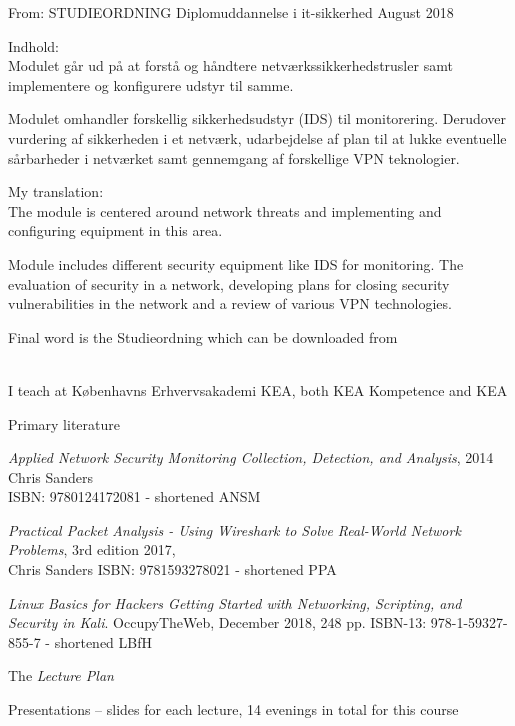 \documentclass[Screen16to9,17pt]{foils}
\begin{document}

From: STUDIEORDNING Diplomuddannelse i it-sikkerhed August 2018

Indhold:\\
Modulet går ud på at forstå og håndtere netværkssikkerhedstrusler samt implementere og
konfigurere udstyr til samme.

Modulet omhandler forskellig sikkerhedsudstyr (IDS) til monitorering. Derudover vurdering af sikkerheden i et netværk, udarbejdelse af plan til at lukke eventuelle sårbarheder i netværket samt gennemgang af forskellige VPN teknologier.

My translation:\\
The module is centered around network threats and implementing and configuring equipment in this area.

Module includes different security equipment like IDS for monitoring.
The evaluation of security in a network, developing plans for closing security vulnerabilities in the network and a review of various VPN technologies.

Final word is the Studieordning which can be downloaded from\\
{\footnotesize {}\\
}







I teach at Københavns Erhvervsakademi KEA, both KEA Kompetence and KEA




Primary literature
\begin{list2}
\item \emph{Applied Network Security Monitoring Collection, Detection, and Analysis}, 2014 Chris Sanders \\
ISBN: 9780124172081 - shortened ANSM
\item \emph{Practical Packet Analysis - Using Wireshark to Solve Real-World Network Problems}, 3rd edition 2017, \\
Chris Sanders ISBN: 9781593278021 - shortened PPA
\item \emph{Linux Basics for Hackers Getting Started with Networking, Scripting, and Security in Kali}. OccupyTheWeb, December 2018, 248 pp. ISBN-13: 978-1-59327-855-7 - shortened LBfH
\item The \emph{Lecture Plan}\\
\item Presentations -- slides for each lecture, 14 evenings in total for this course\\{\footnotesize
{}}
\end{list2}
\end{document}

